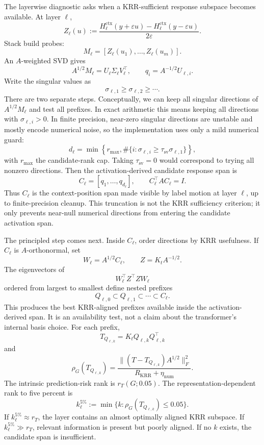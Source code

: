 \documentclass[11pt]{article}
\begin{document}
The layerwise diagnostic asks when a KRR-sufficient response subspace becomes available. At layer
\(\ell\),
\[
Z_\ell(u)
:=
\frac{
H_\ell^{\mathrm{ctx}}(y+\varepsilon u)-H_\ell^{\mathrm{ctx}}(y-\varepsilon u)
}{2\varepsilon}.
\]
Stack build probes:
\[
M_\ell=[Z_\ell(u_1),\ldots,Z_\ell(u_m)].
\]
An \(A\)-weighted SVD gives
\[
A^{1/2}M_\ell=U_\ell\Sigma_\ell V_\ell^\top,
\qquad
q_i=A^{-1/2}U_{\ell,i}.
\]
Write the singular values as
\[
\sigma_{\ell,1}\ge\sigma_{\ell,2}\ge\cdots.
\]
There are two separate steps. Conceptually, we can keep all singular directions of
\(A^{1/2}M_\ell\) and test all prefixes. In exact arithmetic this means keeping all directions with
\(\sigma_{\ell,i}>0\). In finite precision, near-zero singular directions are unstable and mostly
encode numerical noise, so the implementation uses only a mild numerical guard:
\[
d_\ell
=
\min\left\{
r_{\max},
\#\{i:\sigma_{\ell,i}\ge\tau_{\mathrm{sv}}\sigma_{\ell,1}\}
\right\},
\]
with \(r_{\max}\) the candidate-rank cap. Taking \(\tau_{\mathrm{sv}}=0\) would correspond to trying
all nonzero directions. Then the activation-derived candidate response span is
\[
C_\ell
=
[q_1,\ldots,q_{d_\ell}],
\qquad
C_\ell^\top A C_\ell=I.
\]
Thus \(C_\ell\) is the context-position span made visible by label motion at layer \(\ell\), up to
finite-precision cleanup. This truncation is not the KRR sufficiency criterion; it only prevents
near-null numerical directions from entering the candidate activation span.

The principled step comes next. Inside \(C_\ell\), order directions by KRR usefulness. If
\(C_\ell\) is \(A\)-orthonormal, set
\[
W_\ell=A^{1/2}C_\ell,
\qquad
Z=K_tA^{-1/2}.
\]
The eigenvectors of
\[
W_\ell^\top Z^\top ZW_\ell
\]
ordered from largest to smallest define nested prefixes
\[
Q_{\ell,0}\subset Q_{\ell,1}\subset\cdots\subset C_\ell.
\]
This produces the best KRR-aligned prefixes available inside the activation-derived span. It is an
availability test, not a claim about the transformer's internal basis choice. For each prefix,
\[
T_{Q_{\ell,k}}=K_tQ_{\ell,k}Q_{\ell,k}^\top
\]
and
\[
\rho_G(T_{Q_{\ell,k}})
=
\frac{\|(T-T_{Q_{\ell,k}})A^{1/2}\|_F^2}{R_{\mathrm{KRR}}+\eta_{\mathrm{num}}}.
\]
The intrinsic prediction-risk rank is \(r_T(G;0.05)\). The representation-dependent rank to five
percent is
\[
k_\ell^{5\%}
:=
\min\{k:\rho_G(T_{Q_{\ell,k}})\le0.05\}.
\]
If \(k_\ell^{5\%}\approx r_T\), the layer contains an almost optimally aligned KRR subspace. If
\(k_\ell^{5\%}\gg r_T\), relevant information is present but poorly aligned. If no \(k\) exists,
the candidate span is insufficient.
\end{document}
